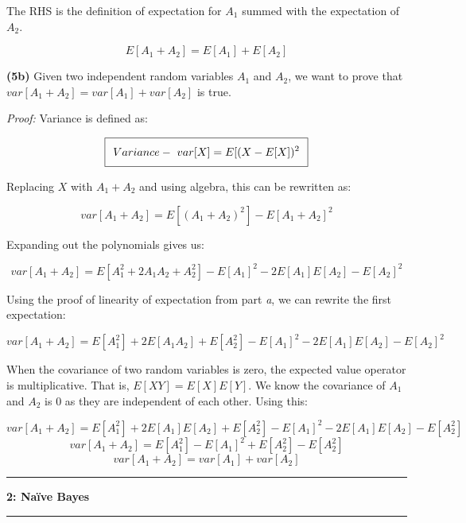 \documentclass[11pt]{article}
\newcommand\question[2]{\vspace{.25in}\hrule\textbf{#1: #2}\vspace{.5em}\hrule\vspace{.10in}}
\renewcommand\part[1]{\vspace{.10in}\textbf{(#1)}}
\begin{document}
The RHS is the definition of expectation for $A_1$ summed with the expectation of $A_2$.

$$E[A_1 + A_2] = E[A_1] + E[A_2]$$

\part{5b} Given two independent random variables $A_1$ and $A_2$, we want to prove that $var[A_1 + A_2] = var[A_1] + var[A_2]$ is true.

\textit{Proof:} Variance is defined as:

\begin{equation}
\setlength\fboxsep{0.25cm}
\setlength\fboxrule{0.4pt}
\boxed{Variance - \ var[X] = E[(X - E[X])^2}
\end{equation} 

Replacing $X$ with $A_1 + A_2$ and using algebra, this can be rewritten as:

$$var[A_1 + A_2] = E[(A_1 + A_2)^2] - E[A_1 + A_2]^2$$

Expanding out the polynomials gives us:

$$var[A_1 + A_2] = E[A_1^2 + 2A_1A_2 + A_2^2] - E[A_1]^2 - 2E[A_1]E[A_2] - E[A_2]^2$$

Using the proof of linearity of expectation from part \textit{a}, we can rewrite the first expectation:

$$var[A_1 + A_2] = E[A_1^2] + 2E[A_1A_2] + E[A_2^2] - E[A_1]^2 - 2E[A_1]E[A_2] - E[A_2]^2$$ 

When the covariance of two random variables is zero, the expected value operator is multiplicative. That is, $E[XY] = E[X]E[Y]$. We know the covariance of $A_1$ and $A_2$ is 0 as they are independent of each other. Using this:

$$var[A_1 + A_2] = E[A_1^2] + 2E[A_1]E[A_2] + E[A_2^2] - E[A_1]^2 - 2E[A_1]E[A_2] - E[A_2^2]$$
$$var[A_1 + A_2] = E[A_1^2] - E[A_1]^2 + E[A_2^2] - E[A_2^2]$$
$$var[A_1 + A_2] = var[A_1] + var[A_2]$$

\question{2}{Na\"{i}ve Bayes}
\end{document}

